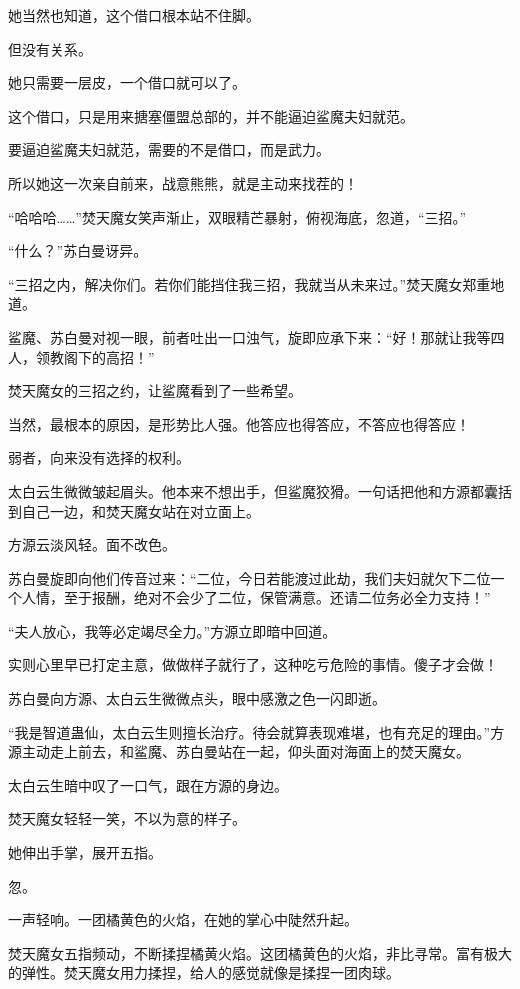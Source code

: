 \begin{this_body}
她当然也知道，这个借口根本站不住脚。

但没有关系。

她只需要一层皮，一个借口就可以了。

这个借口，只是用来搪塞僵盟总部的，并不能逼迫鲨魔夫妇就范。

要逼迫鲨魔夫妇就范，需要的不是借口，而是武力。

所以她这一次亲自前来，战意熊熊，就是主动来找茬的！

“哈哈哈……”焚天魔女笑声渐止，双眼精芒暴射，俯视海底，忽道，“三招。”

“什么？”苏白曼讶异。

“三招之内，解决你们。若你们能挡住我三招，我就当从未来过。”焚天魔女郑重地道。

鲨魔、苏白曼对视一眼，前者吐出一口浊气，旋即应承下来：“好！那就让我等四人，领教阁下的高招！”

焚天魔女的三招之约，让鲨魔看到了一些希望。

当然，最根本的原因，是形势比人强。他答应也得答应，不答应也得答应！

弱者，向来没有选择的权利。

太白云生微微皱起眉头。他本来不想出手，但鲨魔狡猾。一句话把他和方源都囊括到自己一边，和焚天魔女站在对立面上。

方源云淡风轻。面不改色。

苏白曼旋即向他们传音过来：“二位，今日若能渡过此劫，我们夫妇就欠下二位一个人情，至于报酬，绝对不会少了二位，保管满意。还请二位务必全力支持！”

“夫人放心，我等必定竭尽全力。”方源立即暗中回道。

实则心里早已打定主意，做做样子就行了，这种吃亏危险的事情。傻子才会做！

苏白曼向方源、太白云生微微点头，眼中感激之色一闪即逝。

“我是智道蛊仙，太白云生则擅长治疗。待会就算表现难堪，也有充足的理由。”方源主动走上前去，和鲨魔、苏白曼站在一起，仰头面对海面上的焚天魔女。

太白云生暗中叹了一口气，跟在方源的身边。

焚天魔女轻轻一笑，不以为意的样子。

她伸出手掌，展开五指。

忽。

一声轻响。一团橘黄色的火焰，在她的掌心中陡然升起。

焚天魔女五指频动，不断揉捏橘黄火焰。这团橘黄色的火焰，非比寻常。富有极大的弹性。焚天魔女用力揉捏，给人的感觉就像是揉捏一团肉球。


\end{this_body}
